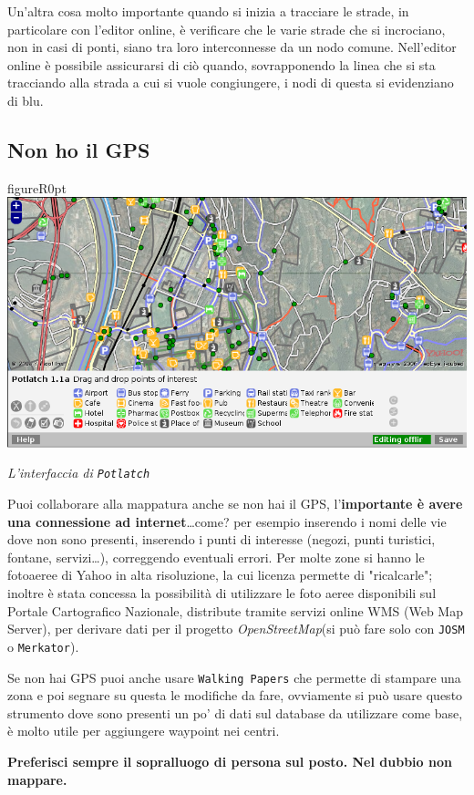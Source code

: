\documentclass[a4paper,twoside,12pt,]{article}
\newcommand{\osm}{\emph{OpenStreetMap\xspace}}
\newcommand{\gps}{GPS\xspace}
\begin{document}
Un'altra cosa molto importante quando si inizia a tracciare le strade, in particolare con l'editor online, è verificare che le varie strade che si incrociano, non in casi di ponti, siano tra loro interconnesse da un nodo comune. Nell'editor online è possibile assicurarsi di ciò quando, sovrapponendo la linea che si sta tracciando alla strada a cui si vuole congiungere, i nodi di questa si evidenziano di blu.
\subsection{Non ho il \gps}
\begin{wrapfloat}{figure}{R}{0pt}
 \includegraphics[width=0.7\columnwidth]{potlatch.png}
 \caption{\textit{L'interfaccia di \texttt{Potlatch}}}
\end{wrapfloat}
Puoi collaborare alla mappatura anche se non hai il \gps, l'\textbf{importante è avere una connessione ad internet}\dots come? per esempio inserendo i nomi delle vie dove non sono presenti, inserendo i punti di interesse (negozi, punti turistici, fontane, servizi\dots), correggendo eventuali errori. Per molte zone si hanno le fotoaeree di Yahoo in alta risoluzione, la cui licenza permette di "ricalcarle"; inoltre è stata concessa la possibilità di utilizzare le foto aeree disponibili sul Portale Cartografico Nazionale, distribute tramite servizi online WMS (Web Map Server), per derivare dati per il progetto \osm (si può fare solo con \texttt{JOSM} o \texttt{Merkator}). 

Se non hai \gps puoi anche usare \texttt{Walking Papers} che permette di stampare una zona e poi segnare su questa le modifiche da fare, ovviamente si può usare questo strumento dove sono presenti un po' di dati sul database da utilizzare come base, è molto utile per aggiungere waypoint nei centri.

\textbf{Preferisci sempre il sopralluogo di persona sul posto. Nel dubbio non mappare.}
\end{document}
